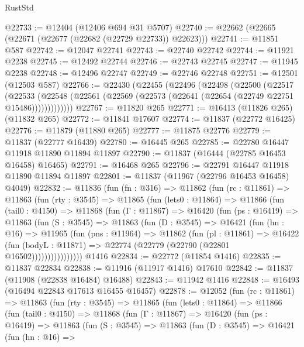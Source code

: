 \begin{lexlean}{RustStd}
\begin{coremodule}
{\begin{coremodule}
{{{{{{{{{{{{{{{{{{{{{{{{{{{{{{{{{{{{{{{{{{{{{{{{{{@22733 := @12404 (@12406 @694 @31 @5707)
@22740 := @22662 (@22665 (@22671 (@22677 (@22682 (@22729 @22733)) @22623)))
@22741 := @11851 @587
@22742 := @12047 @22741
@22743 := @22740 @22742
@22744 := @11921 @2238
@22745 := @12492 @22744
@22746 := @22743 @22745
@22747 := @11945 @2238
@22748 := @12496 @22747
@22749 := @22746 @22748
@22751 := @12501 (@12503 @587)
@22766 := @22430
    (@22455
      (@22496
        (@22498
          (@22500
            (@22517
              (@22533
                (@22548 (@22561 (@22569 (@22573 (@22641 (@22654 (@22749 @22751 @15486)))))))))))))
@22767 := @11820 @265
@22771 := @16413 (@11826 @265) (@11832 @265)
@22772 := @11841 @17607
@22774 := @11837 (@22772 @16425)
@22776 := @11879 (@11880 @265)
@22777 := @11875 @22776
@22779 := @11837 (@22777 @16439)
@22780 := @16445 @265
@22785 := @22780 @16447 @11918 @11890 @11894 @11897
@22790 := @11837 (@16444 (@22785 @16453 @16458) @16465)
@22791 := @16468 @265
@22796 := @22791 @16447 @11918 @11890 @11894 @11897
@22801 := @11837 (@11967 (@22796 @16453 @16458) @4049)
@22832 := @11836
    (fun (fn : @316) =>
    @11862
      (fun (rc : @11861) =>
      @11863
        (fun (rty : @3545) =>
        @11865
          (fun (lets0 : @11864) =>
          @11866
            (fun (tail0 : @4150) =>
            @11868
              (fun (Γ : @11867) =>
              @16420
                (fun (ps : @16419) =>
                @11863
                  (fun (S : @3545) =>
                  @11863
                    (fun (D : @3545) =>
                    @16421
                      (fun (hn : @16) =>
                      @11965
                        (fun (pns : @11964) =>
                        @11862
                          (fun (pl : @11861) =>
                          @16422
                            (fun (bodyL : @11871) =>
                            @22774 (@22779 (@22790 (@22801 @16502))))))))))))))))
    @1416
@22834 := @22772 (@11854 @1416)
@22835 := @11837 @22834
@22838 := @11916 (@11917 @1416) @17610
@22842 := @11837 (@11908 (@22838 @16484) @16488)
@22843 := @11942 @1416
@22848 := @16493 (@16494 @22843 @17613 @16455 @16457)
@22878 := @12052
    (fun (rc : @11861) =>
    @11863
      (fun (rty : @3545) =>
      @11865
        (fun (lets0 : @11864) =>
        @11866
          (fun (tail0 : @4150) =>
          @11868
            (fun (Γ : @11867) =>
            @16420
              (fun (ps : @16419) =>
              @11863
                (fun (S : @3545) =>
                @11863
                  (fun (D : @3545) =>
                  @16421
                    (fun (hn : @16) =>
}}}}}}}}}}}}}}}}}}}}}}}}}}}}}}}}}}}}}}}}}}}}}}}}}}
\end{coremodule}}
\end{coremodule}
\end{lexlean}
